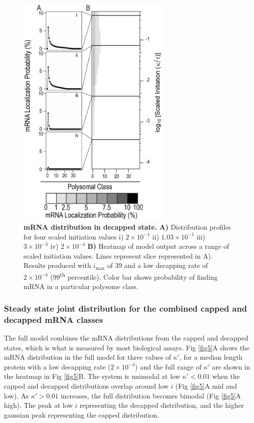 \documentclass[10pt,letterpaper]{article}
\newcommand{\imax}{\ensuremath{{i_{\max}}}\xspace}
\begin{document}
\begin{figure}[!h]
  \begin{center}
    \includegraphics[width=75mm]{Images/2023-07-04_Marked_slices.png}
    \caption{{\bf mRNA distribution in decapped state.}  {\bf A)} Distribution profiles for four scaled initiation values i) $2\times 10^{-1}$ ii) $1.03\times 10^{-1}$ iii) $3\times 10^{-3}$ iv) $2\times 10^{-4}$ {\bf B)} Heatmap of model output across a range of scaled initiation values.
      Lines represent slice represented in A).
      Results produced with \imax of 39 and a low decapping rate of $2\times10^{-4}$  (99\textsuperscript{th} percentile).
      Color bar shows probability of finding mRNA in a particular polysome class.}
    \label{fig4}
  \end{center}
\end{figure}


\subsubsection*{Steady state joint distribution for the combined capped and decapped mRNA classes}
The full model combines the mRNA distributions from the capped and decapped states, which is what is measured by most biological assays.
Fig \ref{fig5}A shows the mRNA distribution in the full model for three values of $\kappa'$, for a median length protein with a low decapping rate ($2\times10^{-4}$) and the full range of $\kappa'$ are shown in the heatmap in Fig \ref{fig5}B.
The system is unimodal at low $\kappa'<0.01$ when the capped and decapped distributions overlap around low $i$ (Fig \ref{fig5}A mid and low). 
As $\kappa'>0.01$ increases, the full distribution becomes bimodal (Fig \ref{fig5}A high).
The peak at low $i$ representing the decapped distribution, and the higher gaussian peak representing the capped distribution. 
\end{document}
